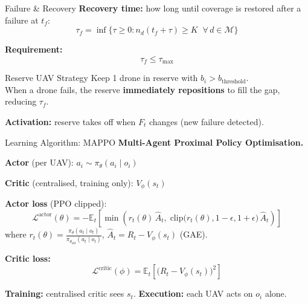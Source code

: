 \documentclass[aspectratio=169,12pt]{beamer}
\begin{document}
\begin{frame}{Failure \& Recovery}
\textbf{Recovery time:} how long until coverage is restored after a failure at $t_f$:
\[
\tau_f = \inf\!\bigl\{\tau \ge 0 :
  n_d(t_f + \tau) \ge K \;\;\forall\, d \in \mathcal{M}\bigr\}
\]

\vspace{0.4em}
\textbf{Requirement:}
\[
\tau_f \le \tau_{\max}
\]

\vspace{0.5em}
\begin{block}{Reserve UAV Strategy}
Keep 1 drone in reserve with $b_i > b_{\text{threshold}}$.\\[0.2em]
When a drone fails, the reserve \textbf{immediately repositions} to fill the gap, reducing $\tau_f$.
\end{block}

\vspace{0.3em}
\textbf{Activation:} reserve takes off when $F_t$ changes (new failure detected).
\end{frame}

\begin{frame}{Learning Algorithm: MAPPO}
\textbf{Multi-Agent Proximal Policy Optimisation.}

\vspace{0.3em}
\textbf{Actor} (per UAV):
$a_i \sim \pi_\theta(a_i \mid o_i)$

\vspace{0.3em}
\textbf{Critic} (centralised, training only):
$V_\phi(s_t)$

\vspace{0.3em}
\textbf{Actor loss} (PPO clipped):
\[
\mathcal{L}^{\text{actor}}(\theta)
= -\mathbb{E}_t\!\left[
  \min\!\left(
    r_t(\theta)\,\hat{A}_t,\;
    \text{clip}\bigl(r_t(\theta), 1{-}\epsilon, 1{+}\epsilon\bigr)\,\hat{A}_t
  \right)
\right]
\]
where $r_t(\theta) = \frac{\pi_\theta(a_t \mid o_t)}{\pi_{\theta_{\text{old}}}(a_t \mid o_t)}$,
$\hat{A}_t = R_t - V_\phi(s_t)$ (GAE).

\vspace{0.3em}
\textbf{Critic loss:}
\[
\mathcal{L}^{\text{critic}}(\phi)
= \mathbb{E}_t\!\left[\bigl(R_t - V_\phi(s_t)\bigr)^2\right]
\]

\vspace{0.3em}
\textbf{Training:} centralised critic sees $s_t$. \textbf{Execution:} each UAV acts on $o_i$ alone.
\end{frame}
\end{document}
